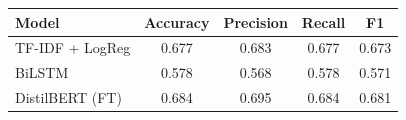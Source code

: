 \begin{tabular}{lcccc}
\toprule
Model & Accuracy & Precision & Recall & F1 \\
\midrule
TF-IDF + LogReg & 0.677 & 0.683 & 0.677 & 0.673 \\
BiLSTM & 0.578 & 0.568 & 0.578 & 0.571 \\
DistilBERT (FT) & 0.684 & 0.695 & 0.684 & 0.681 \\
\bottomrule
\end{tabular}
